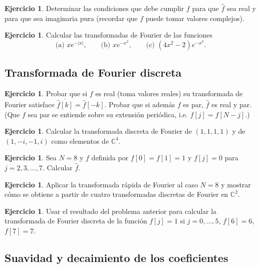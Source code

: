 \documentclass[12pt, a4paper]{amsbook}
\newcommand{\C}{{\mathbb C}}
\theoremstyle{remark}
\theoremstyle{definition}
\newtheorem{ejer}[teo]{Ejercicio}
\numberwithin{section}{chapter}
\numberwithin{subsection}{section}
\numberwithin{equation}{section}
\numberwithin{figure}{chapter}
\begin{document}
\begin{ejer}
Determinar las condiciones que debe cumplir $f$ para que $\hat f$ sea real y para que sea imaginaria pura (recordar que $f$ puede tomar valores complejos).
\end{ejer}

\begin{ejer}
Calcular las transformadas de Fourier de las funciones
$$
\text{(a) } xe^{-|x|}, \qquad \text{(b) } xe^{-x^2},\qquad \text{(c) } (4x^2-2) e^{-x^2}.
$$
\end{ejer}

\subsection*{Transformada de Fourier discreta}

\begin{ejer}
Probar que si $f$ es real (toma valores reales) su transformada de Fourier satisface $\overline{\hat f[k]} = \hat f[-k]$. Probar que si además $f$ es par, $\hat f$ es real y par. (Que $f$ sea par se entiende sobre su extensión periódica, i.e. $f[j] = f[N-j]$.)
\end{ejer}

\begin{ejer}
Calcular la transformada discreta de Fourier de $(1,1,1,1)$ y de $(1,-i,-1,i)$ como elementos de $\C^4$.
\end{ejer}

\begin{ejer}
Sea $N=8$ y $f$ definida por $f[0] = f[1] = 1$ y $f[j]=0$ para $j=2,3,\dots,7$. Calcular $\hat f$.
\end{ejer}

\begin{ejer}
Aplicar la transformada rápida de Fourier al caso $N=8$ y mostrar cómo se obtiene a partir de cuatro transformadas discretas de Fourier en $\C^2$.
\end{ejer}

\begin{ejer}
Usar el resultado del problema anterior para calcular la transformada de Fourier discreta de la función $f[j]=1$ si $j=0,\dots,5$, $f[6]=6$, $f[7]=7$.
\end{ejer}

\subsection*{Suavidad y decaimiento de los coeficientes}
\end{document}
